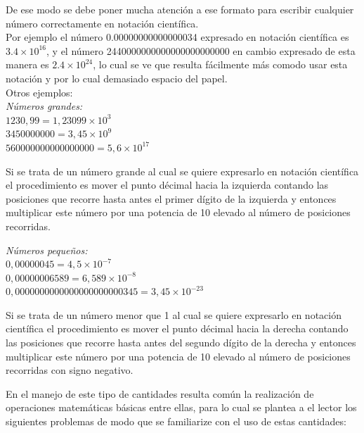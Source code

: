 \documentclass[a5paper,pagesize,10pt,bibtotoc,pointlessnumbers,
normalheadings,DIV=9,fleqn,x11names,table,twoside=false]{scrbook}
\begin{document}
De ese modo se debe poner mucha atención a ese formato para escribir cualquier número correctamente en notación científica.\\

Por ejemplo el número 0.00000000000000034 expresado en notación científica es $3.4\times10^{16}$, y el número 
2440000000000000000000000 en cambio expresado de esta manera es $2.4\times10^{24}$, lo cual se ve que resulta fácilmente más 
comodo usar esta notación y por lo cual demasiado espacio del 
papel.\\

Otros ejemplos:\\

\textit{Números grandes:}\\

$1230,99 = 1,23099\times10^3$\\
$3450000000 = 3,45\times10^{9}$\\
$560000000000000000 = 5,6\times10^{17}$ 

\begin{tcolorbox}
Si se trata de un número grande al cual se quiere expresarlo en notación científica el procedimiento es mover el punto décimal 
hacia la izquierda contando las posiciones que recorre hasta antes el primer dígito de la izquierda y entonces multiplicar este 
número por una potencia de 10 elevado al 
número de posiciones recorridas. 
\end{tcolorbox}

\textit{Números pequeños:}\\

$0,00000045 = 4,5\times10^{-7}$\\
$0,00000006589 = 6,589\times10^{-8}$\\
$0,0000000000000000000000345 = 3,45\times10^{-23}$\\

\begin{tcolorbox}
Si se trata de un número menor que 1 al cual se quiere expresarlo en notación científica el procedimiento es mover el punto 
décimal hacia la derecha contando las posiciones que recorre hasta antes del segundo dígito de la derecha y entonces multiplicar 
este número por una potencia de 10 elevado al número de posiciones recorridas con signo negativo. 
\end{tcolorbox}

En el manejo de este tipo de cantidades resulta común la realización de operaciones matemáticas básicas entre ellas, para lo cual 
se plantea a el lector los siguientes problemas de modo que se familiarize con el uso de estas cantidades:
\end{document}
